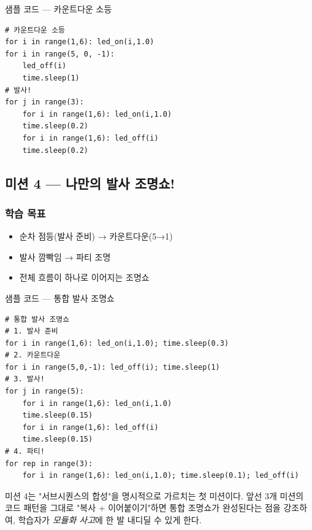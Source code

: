 \begin{labbox}{샘플 코드 --- 카운트다운 소등}
\begin{verbatim}
# 카운트다운 소등
for i in range(1,6): led_on(i,1.0)
for i in range(5, 0, -1):
    led_off(i)
    time.sleep(1)
# 발사!
for j in range(3):
    for i in range(1,6): led_on(i,1.0)
    time.sleep(0.2)
    for i in range(1,6): led_off(i)
    time.sleep(0.2)
\end{verbatim}
\end{labbox}

\subsection{미션 4 --- 나만의 발사 조명쇼!}
\label{subsec:ch10-m4}

\begin{storybox}
\end{storybox}

\subsubsection*{학습 목표}
\begin{itemize}[leftmargin=1.4em]
  \item 순차 점등(발사 준비) → 카운트다운(5→1)
  \item 발사 깜빡임 → 파티 조명
  \item 전체 흐름이 하나로 이어지는 조명쇼
\end{itemize}

\begin{labbox}{샘플 코드 --- 통합 발사 조명쇼}
\begin{verbatim}
# 통합 발사 조명쇼
# 1. 발사 준비
for i in range(1,6): led_on(i,1.0); time.sleep(0.3)
# 2. 카운트다운
for i in range(5,0,-1): led_off(i); time.sleep(1)
# 3. 발사!
for j in range(5):
    for i in range(1,6): led_on(i,1.0)
    time.sleep(0.15)
    for i in range(1,6): led_off(i)
    time.sleep(0.15)
# 4. 파티!
for rep in range(3):
    for i in range(1,6): led_on(i,1.0); time.sleep(0.1); led_off(i)
\end{verbatim}
\end{labbox}

\begin{keypoint}
미션 4는 "서브시퀀스의 합성"을 명시적으로 가르치는 첫 미션이다.
앞선 3개 미션의 코드 패턴을 그대로 "복사 + 이어붙이기"하면 통합
조명쇼가 완성된다는 점을 강조하여, 학습자가 \emph{모듈화 사고}에
한 발 내디딜 수 있게 한다.
\end{keypoint}
